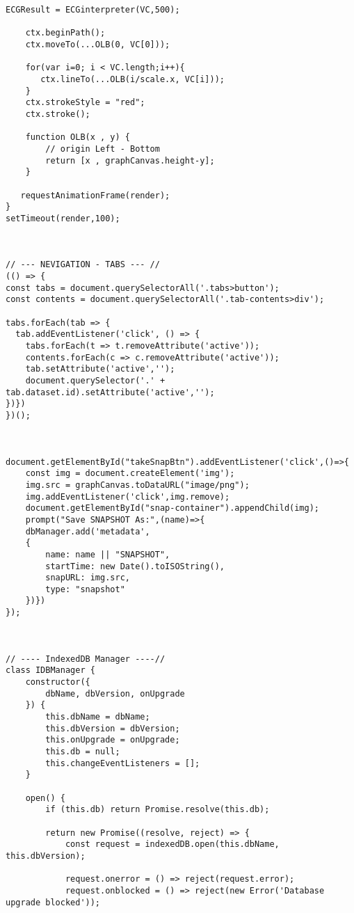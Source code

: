 \begin{lstlisting}[style=htmlcssjs]
    ECGResult = ECGinterpreter(VC,500);
    
    ctx.beginPath();
    ctx.moveTo(...OLB(0, VC[0]));
    
    for(var i=0; i < VC.length;i++){
       ctx.lineTo(...OLB(i/scale.x, VC[i]));
    }
    ctx.strokeStyle = "red";
    ctx.stroke();
    
    function OLB(x , y) {
        // origin Left - Bottom
        return [x , graphCanvas.height-y];
    }
    
   requestAnimationFrame(render);
}
setTimeout(render,100);



// --- NEVIGATION - TABS --- //
(() => {
const tabs = document.querySelectorAll('.tabs>button');
const contents = document.querySelectorAll('.tab-contents>div');

tabs.forEach(tab => {
  tab.addEventListener('click', () => {
    tabs.forEach(t => t.removeAttribute('active'));
    contents.forEach(c => c.removeAttribute('active'));
    tab.setAttribute('active','');
    document.querySelector('.' + tab.dataset.id).setAttribute('active','');
})})
})();



document.getElementById("takeSnapBtn").addEventListener('click',()=>{
    const img = document.createElement('img');
    img.src = graphCanvas.toDataURL("image/png");
    img.addEventListener('click',img.remove);
    document.getElementById("snap-container").appendChild(img);
    prompt("Save SNAPSHOT As:",(name)=>{
    dbManager.add('metadata',
    {
        name: name || "SNAPSHOT",
        startTime: new Date().toISOString(),
        snapURL: img.src,
        type: "snapshot"
    })})
});



// ---- IndexedDB Manager ----//
class IDBManager {
    constructor({
        dbName, dbVersion, onUpgrade
    }) {
        this.dbName = dbName;
        this.dbVersion = dbVersion;
        this.onUpgrade = onUpgrade;
        this.db = null;
        this.changeEventListeners = [];
    }

    open() {
        if (this.db) return Promise.resolve(this.db);

        return new Promise((resolve, reject) => {
            const request = indexedDB.open(this.dbName, this.dbVersion);

            request.onerror = () => reject(request.error);
            request.onblocked = () => reject(new Error('Database upgrade blocked'));


\end{lstlisting}
